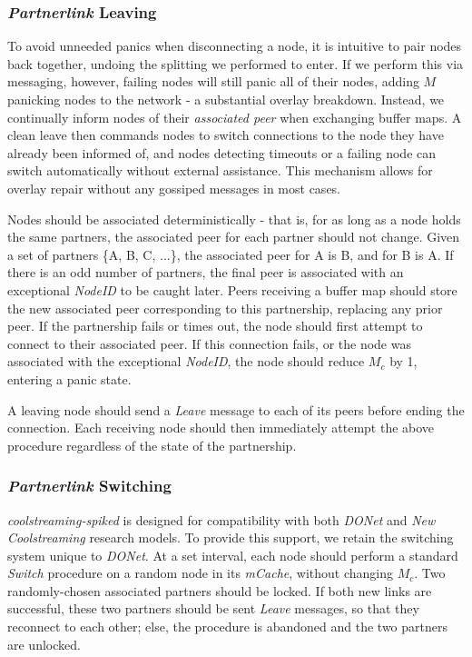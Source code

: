 \documentclass[12pt,a4paper]{article}
\begin{document}
\subsubsection{\textit{Partnerlink} Leaving} \label{css:partnerlink:leaving}
To avoid unneeded panics when disconnecting a node, it is intuitive to pair nodes back together, undoing the splitting we performed to enter. If we perform this via messaging, however, failing nodes will still panic all of their nodes, adding \(M\) panicking nodes to the network - a substantial overlay breakdown. Instead, we continually inform nodes of their \textit{associated peer} when exchanging buffer maps. A clean leave then commands nodes to switch connections to the node they have already been informed of, and nodes detecting timeouts or a failing node can switch automatically without external assistance. This mechanism allows for overlay repair without any gossiped messages in most cases.

Nodes should be associated deterministically - that is, for as long as a node holds the same partners, the associated peer for each partner should not change. Given a set of partners \{A, B, C, ...\}, the associated peer for A is B, and for B is A. If there is an odd number of partners, the final peer is associated with an exceptional \textit{NodeID} to be caught later. Peers receiving a buffer map should store the new associated peer corresponding to this partnership, replacing any prior peer. If the partnership fails or times out, the node should first attempt to connect to their associated peer. If this connection fails, or the node was associated with the exceptional \textit{NodeID}, the node should reduce \(M_c\) by 1, entering a panic state.

A leaving node should send a \textit{Leave} message to each of its peers before ending the connection. Each receiving node should then immediately attempt the above procedure regardless of the state of the partnership.

\subsubsection{\textit{Partnerlink} Switching} \label{css:partnerlink:switching}
\textit{coolstreaming-spiked} is designed for compatibility with both \textit{DONet} and \textit{New Coolstreaming} research models. To provide this support, we retain the switching system unique to \textit{DONet}. At a set interval, each node should perform a standard \textit{Switch} procedure on a random node in its \textit{mCache}, without changing \(M_c\). Two randomly-chosen associated partners should be locked. If both new links are successful, these two partners should be sent \textit{Leave} messages, so that they reconnect to each other; else, the procedure is abandoned and the two partners are unlocked.
\end{document}
